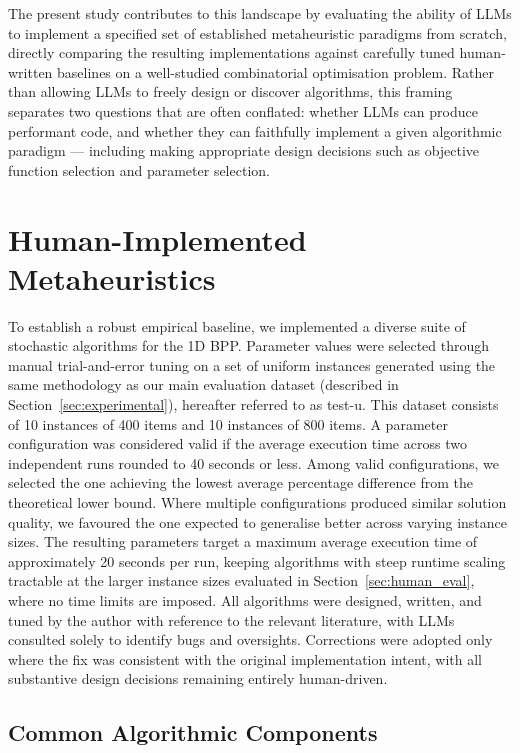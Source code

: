 \documentclass[11pt]{article}
\begin{document}
The present study contributes to this landscape by evaluating the ability of LLMs  
to implement a specified set of established metaheuristic paradigms from 
scratch, directly comparing the resulting implementations against carefully 
tuned human-written baselines on a well-studied combinatorial optimisation 
problem. Rather than allowing LLMs to freely design or discover algorithms, 
this framing separates two questions that are often conflated: whether 
LLMs can produce performant code, and whether they can faithfully implement 
a given algorithmic paradigm --- including making appropriate design 
decisions such as objective function selection and parameter selection.

\section{Human-Implemented Metaheuristics}

To establish a robust empirical baseline, we implemented a diverse suite 
of stochastic algorithms for the 1D BPP. Parameter values were selected through manual trial-and-error tuning on 
a set of uniform instances generated using the same methodology as our 
main evaluation dataset (described in Section~\ref{sec:experimental}), 
hereafter referred to as test-u. This dataset consists of 10 instances 
of 400 items and 10 instances of 800 items. A parameter configuration was considered valid if the 
average execution time across two independent runs rounded to 40 seconds 
or less. Among valid configurations, we selected the 
one achieving the lowest average percentage difference from the theoretical 
lower bound. Where multiple configurations produced similar solution quality, 
we favoured the one expected to generalise better across varying instance 
sizes. The resulting parameters target a maximum average execution time of 
approximately 20 seconds per run, keeping algorithms with steep runtime 
scaling tractable at the larger instance sizes evaluated in Section~\ref{sec:human_eval}, where 
no time limits are imposed. All algorithms were designed, written, and tuned by the author with 
reference to the relevant literature, with LLMs consulted solely to 
identify bugs and oversights. Corrections were adopted only where the 
fix was consistent with the original implementation intent, with all 
substantive design decisions remaining entirely human-driven.

\subsection{Common Algorithmic Components}
\end{document}

